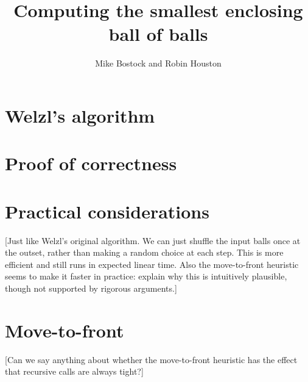 \documentclass[a4paper]{article}
\author{Mike Bostock and Robin Houston}
\title{Computing the smallest enclosing ball of balls}
\begin{document}
\maketitle


\section{Welzl's algorithm}

\section{}

\section{Proof of correctness}

\section{Practical considerations}
[Just like Welzl’s original algorithm. We can just shuffle the input balls once at the outset, rather than making a random choice at each step. This is more efficient and still runs in expected linear time. Also the move-to-front heuristic seems to make it faster in practice: explain why this is intuitively plausible, though not supported by rigorous arguments.]

\section{Move-to-front}
[Can we say anything about whether the move-to-front heuristic has the effect that recursive calls are always tight?]


\end{document}
